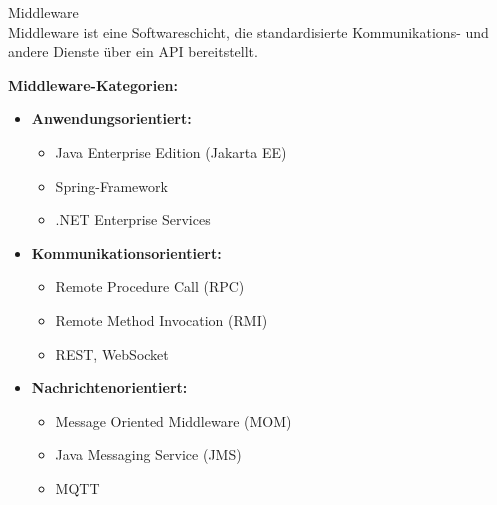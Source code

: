 \begin{concept}{Middleware}\\
Middleware ist eine Softwareschicht, die standardisierte Kommunikations- und andere Dienste über ein API bereitstellt.

\textbf{Middleware-Kategorien:}
\begin{itemize}
    \item \textbf{Anwendungsorientiert:}
    \begin{itemize}
        \item Java Enterprise Edition (Jakarta EE)
        \item Spring-Framework
        \item .NET Enterprise Services
    \end{itemize}
    
    \item \textbf{Kommunikationsorientiert:}
    \begin{itemize}
        \item Remote Procedure Call (RPC)
        \item Remote Method Invocation (RMI)
        \item REST, WebSocket
    \end{itemize}
    
    \item \textbf{Nachrichtenorientiert:}
    \begin{itemize}
        \item Message Oriented Middleware (MOM)
        \item Java Messaging Service (JMS)
        \item MQTT
    \end{itemize}
\end{itemize}
\end{concept}

